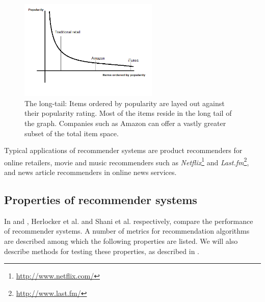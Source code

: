 \begin{figure}%
	\begin{center}
		\includegraphics[width=250px]{img/longtail}%
	\end{center}
	\caption{The long-tail: Items ordered by popularity are layed out against their popularity rating. Most of the items reside in the long tail of the graph. Companies such as Amazon can offer a vastly greater subset of the total item space.}%
	\label{figure:longtail}%
\end{figure}

Typical applications of recommender systems are product recommenders for online retailers, movie and music recommenders such as \emph{Netflix}\footnote{\url{http://www.netflix.com/}} and \emph{Last.fm}\footnote{\url{http://www.last.fm/}}, and news article recommenders in online news services\cite{levy:2010, rajaraman:2012, celma:2008:phd}.


\subsection{Properties of recommender systems}\label{chapter:literature_study:section:computer:subsection:properties}

In \cite{herlocker:2004:ECF:963770.963772} and \cite{shani:2011:9780387858197}, Herlocker et al. and Shani et al.  respectively, compare the performance of recommender systems. A number of metrics for recommendation algorithms are described among which the following properties are listed. We will also describe methods for testing these properties, as described in \cite{shani:2011:9780387858197}.


